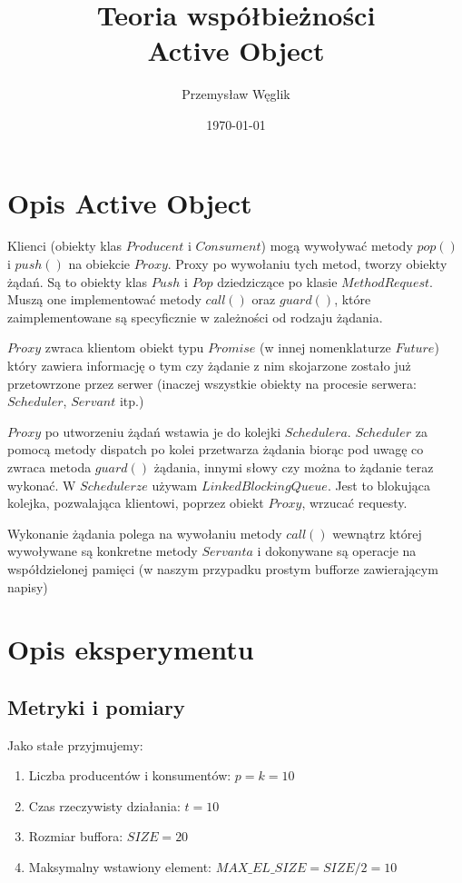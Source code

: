 \documentclass[12pt,a4paper,table]{article}
\begin{document}
    \title {
        Teoria współbieżności \\
        Active Object \\
    }

    \author{
        Przemysław Węglik
    }

    \date{\today}

    \maketitle

    \tableofcontents
    \newpage

    \section{Opis Active Object}

    Klienci (obiekty klas $Producent$ i $Consument$) mogą wywoływać metody 
    $pop()$ i $push()$ na obiekcie $Proxy$. 
    Proxy po wywołaniu tych metod, tworzy obiekty żądań.
    Są to obiekty klas $Push$ i $Pop$ dziedziczące po klasie $MethodRequest$.
    Muszą one implementować metody $call()$ oraz $guard()$, które zaimplementowane
    są specyficznie w zależności od rodzaju żądania.

    $Proxy$ zwraca klientom obiekt typu $Promise$ (w innej nomenklaturze $Future$)
    który zawiera informację o tym czy żądanie z nim skojarzone zostało już
    przetowrzone przez serwer (inaczej wszystkie obiekty na procesie serwera:
    $Scheduler$, $Servant$ itp.)

    $Proxy$ po utworzeniu żądań wstawia je do kolejki $Schedulera$.
    $Scheduler$ za pomocą metody dispatch po kolei przetwarza żądania
    biorąc pod uwagę co zwraca metoda $guard()$ żądania, innymi słowy czy można
    to żądanie teraz wykonać.
    W $Schedulerze$ używam $LinkedBlockingQueue$. Jest to blokująca kolejka,
    pozwalająca klientowi, poprzez obiekt $Proxy$, wrzucać requesty.

    Wykonanie żądania polega na wywołaniu metody $call()$ wewnątrz której
    wywoływane są konkretne metody $Servanta$ i dokonywane są operacje 
    na współdzielonej pamięci (w naszym przypadku prostym bufforze zawierającym napisy)

    \section{Opis eksperymentu} 
    \subsection{Metryki i pomiary}
    Jako stałe przyjmujemy:
    \begin{enumerate}
        \item Liczba producentów i konsumentów: $p=k=10$
        \item Czas rzeczywisty działania: $t=10$
        \item Rozmiar buffora: $SIZE=20$
        \item Maksymalny wstawiony element: $MAX\_EL\_SIZE=SIZE/2=10$
    \end{enumerate}
\end{document}
